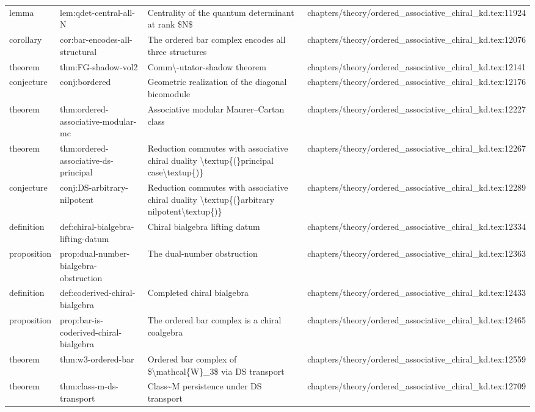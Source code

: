 \documentclass[11pt]{article}
\begin{document}
\begin{longtable}{L{0.10\textwidth}L{0.26\textwidth}L{0.42\textwidth}L{0.22\textwidth}}
lemma & lem:qdet-central-all-N & Centrality of the quantum determinant at rank \$N\$ & chapters/theory/ordered\_associative\_chiral\_kd.tex:11924\\
corollary & cor:bar-encodes-all-structural & The ordered bar complex encodes all three structures & chapters/theory/ordered\_associative\_chiral\_kd.tex:12076\\
theorem & thm:FG-shadow-vol2 & Comm\textbackslash{}-utator-shadow theorem & chapters/theory/ordered\_associative\_chiral\_kd.tex:12141\\
conjecture & conj:bordered & Geometric realization of the diagonal bicomodule & chapters/theory/ordered\_associative\_chiral\_kd.tex:12176\\
theorem & thm:ordered-associative-modular-mc & Associative modular Maurer--Cartan class & chapters/theory/ordered\_associative\_chiral\_kd.tex:12227\\
theorem & thm:ordered-associative-ds-principal & Reduction commutes with associative chiral duality \textbackslash{}textup\{(\}principal case\textbackslash{}textup\{)\} & chapters/theory/ordered\_associative\_chiral\_kd.tex:12267\\
conjecture & conj:DS-arbitrary-nilpotent & Reduction commutes with associative chiral duality \textbackslash{}textup\{(\}arbitrary nilpotent\textbackslash{}textup\{)\} & chapters/theory/ordered\_associative\_chiral\_kd.tex:12289\\
definition & def:chiral-bialgebra-lifting-datum & Chiral bialgebra lifting datum & chapters/theory/ordered\_associative\_chiral\_kd.tex:12334\\
proposition & prop:dual-number-bialgebra-obstruction & The dual-number obstruction & chapters/theory/ordered\_associative\_chiral\_kd.tex:12363\\
definition & def:coderived-chiral-bialgebra & Completed chiral bialgebra & chapters/theory/ordered\_associative\_chiral\_kd.tex:12433\\
proposition & prop:bar-is-coderived-chiral-bialgebra & The ordered bar complex is a chiral coalgebra & chapters/theory/ordered\_associative\_chiral\_kd.tex:12465\\
theorem & thm:w3-ordered-bar & Ordered bar complex of \$\textbackslash{}mathcal\{W\}\_3\$ via DS transport & chapters/theory/ordered\_associative\_chiral\_kd.tex:12559\\
theorem & thm:class-m-ds-transport & Class\textasciitilde{}M persistence under DS transport & chapters/theory/ordered\_associative\_chiral\_kd.tex:12709\\

\end{longtable}
\end{document}
